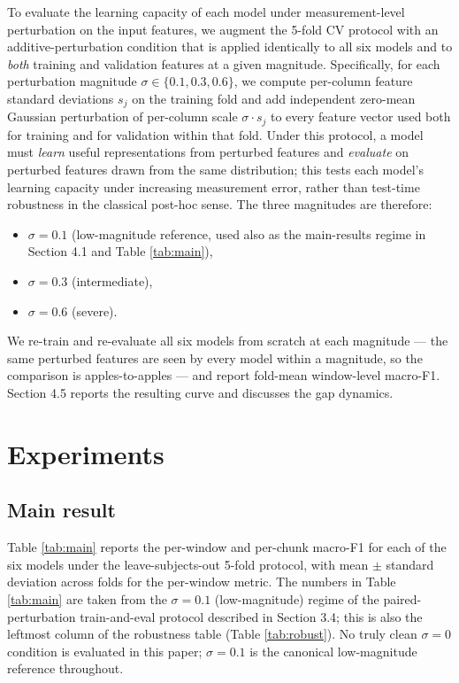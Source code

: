 \documentclass{article}
\begin{document}
To evaluate the learning capacity of each model under measurement-level perturbation on the input features, we augment the 5-fold CV protocol with an additive-perturbation condition that is applied identically to all six models and to \emph{both} training and validation features at a given magnitude. Specifically, for each perturbation magnitude $\sigma \in \{0.1, 0.3, 0.6\}$, we compute per-column feature standard deviations $s_j$ on the training fold and add independent zero-mean Gaussian perturbation of per-column scale $\sigma \cdot s_j$ to every feature vector used both for training and for validation within that fold. Under this protocol, a model must \emph{learn} useful representations from perturbed features and \emph{evaluate} on perturbed features drawn from the same distribution; this tests each model's learning capacity under increasing measurement error, rather than test-time robustness in the classical post-hoc sense. The three magnitudes are therefore:

\begin{itemize}
    \item $\sigma = 0.1$ (low-magnitude reference, used also as the main-results regime in Section 4.1 and Table \ref{tab:main}),
    \item $\sigma = 0.3$ (intermediate),
    \item $\sigma = 0.6$ (severe).
\end{itemize}

We re-train and re-evaluate all six models from scratch at each magnitude --- the same perturbed features are seen by every model within a magnitude, so the comparison is apples-to-apples --- and report fold-mean window-level macro-F1. Section 4.5 reports the resulting curve and discusses the gap dynamics.

\section{Experiments}

\subsection{Main result}

Table \ref{tab:main} reports the per-window and per-chunk macro-F1 for each of the six models under the leave-subjects-out 5-fold protocol, with mean $\pm$ standard deviation across folds for the per-window metric. The numbers in Table \ref{tab:main} are taken from the $\sigma = 0.1$ (low-magnitude) regime of the paired-perturbation train-and-eval protocol described in Section 3.4; this is also the leftmost column of the robustness table (Table \ref{tab:robust}). No truly clean $\sigma = 0$ condition is evaluated in this paper; $\sigma = 0.1$ is the canonical low-magnitude reference throughout.
\end{document}
